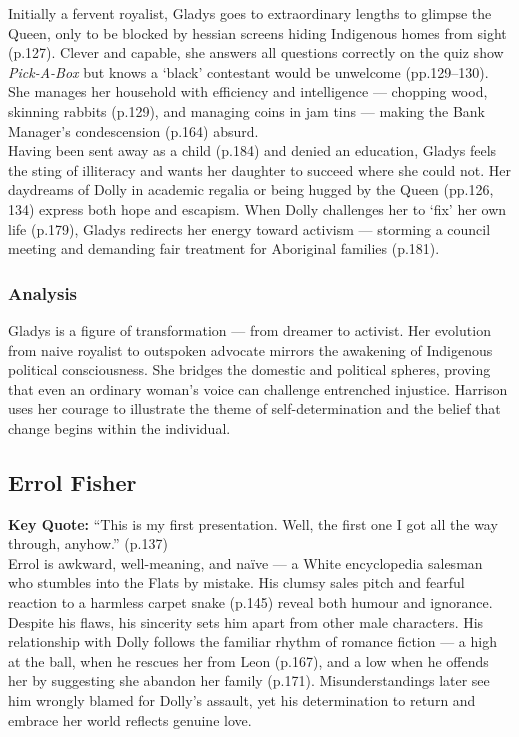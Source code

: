 \documentclass[a4paper]{article}
\begin{document}
Initially a fervent royalist, Gladys goes to extraordinary lengths to glimpse the Queen, only to be blocked by hessian screens hiding Indigenous homes from sight (p.127). Clever and capable, she answers all questions correctly on the quiz show \textit{Pick-A-Box} but knows a ‘black’ contestant would be unwelcome (pp.129–130). She manages her household with efficiency and intelligence — chopping wood, skinning rabbits (p.129), and managing coins in jam tins — making the Bank Manager’s condescension (p.164) absurd.\\

Having been sent away as a child (p.184) and denied an education, Gladys feels the sting of illiteracy and wants her daughter to succeed where she could not. Her daydreams of Dolly in academic regalia or being hugged by the Queen (pp.126, 134) express both hope and escapism. When Dolly challenges her to ‘fix’ her own life (p.179), Gladys redirects her energy toward activism — storming a council meeting and demanding fair treatment for Aboriginal families (p.181).\\

\subsubsection{Analysis}
Gladys is a figure of transformation — from dreamer to activist. Her evolution from naive royalist to outspoken advocate mirrors the awakening of Indigenous political consciousness. She bridges the domestic and political spheres, proving that even an ordinary woman’s voice can challenge entrenched injustice. Harrison uses her courage to illustrate the theme of self-determination and the belief that change begins within the individual.\\

\subsection{Errol Fisher}
\textbf{Key Quote:} ``This is my first presentation. Well, the first one I got all the way through, anyhow.'' (p.137)\\

Errol is awkward, well-meaning, and naïve — a White encyclopedia salesman who stumbles into the Flats by mistake. His clumsy sales pitch and fearful reaction to a harmless carpet snake (p.145) reveal both humour and ignorance. Despite his flaws, his sincerity sets him apart from other male characters. His relationship with Dolly follows the familiar rhythm of romance fiction — a high at the ball, when he rescues her from Leon (p.167), and a low when he offends her by suggesting she abandon her family (p.171). Misunderstandings later see him wrongly blamed for Dolly’s assault, yet his determination to return and embrace her world reflects genuine love.\\
\end{document}
